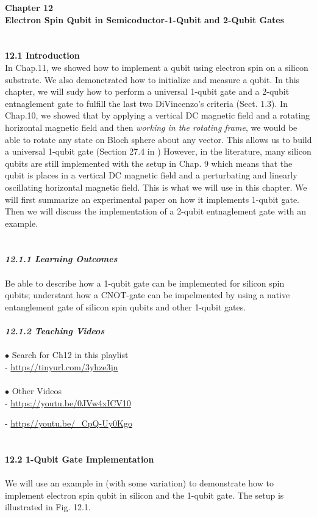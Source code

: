 \documentclass{article}
\newcommand{\bfit}[1]{\textit{\textbf{#1}}}
\begin{document}
\medskip
\noindent
\textbf{\Large Chapter 12\\
Electron Spin Qubit in Semicoductor-1-Qubit and 2-Qubit Gates}\\\\\\
\medskip
\textbf{\large 12.1 Introduction}\\
In Chap.11, we showed how to implement a qubit using electron spin on a silicon
substrate. We also demonetrated how to initialize and measure a qubit. In this chapter,
we will sudy how to perform a universal 1-qubit gate and a 2-qubit entnaglement gate to fulfill
the last two DiVincenzo's criteria (Sect. 1.3). In Chap.10, we showed
that by applying a vertical DC magnetic field and a rotating  horizontal magnetic field and
then \textit{working in the rotating frame}, we would be able to rotate any state on Bloch sphere
about any vector. This allows us to build a universal 1-qubit gate (Section 27.4 in \cite{WongHuiYong})
However, in the literature, many silicon qubits are still implemented with the setup in Chap. 9 which means
that the qubit is places in a vertical DC magnetic field and a perturbating and linearly oscillating horizontal
magnetic field. This is what we will use in this chapter. We will first summarize an experimental paper on how
it implements 1-qubit gate. Then we will discuss the implementation of a 2-qubit entnaglement gate with an example.
\\\\\\
\bfit{\large 12.1.1 Learning Outcomes}
\\\\
Be able to describe how a 1-qubit gate can be implemented for silicon spin qubits; 
understant how a CNOT-gate can be impelmented by using a native entanglement gate of
silicon spin qubits and other 1-qubit gates.
\\\\
\bfit{\large 12.1.2 Teaching Videos}\\\\
$\bullet$ Search for Ch12 in this playlist\\

- \url{https//tinyurl.com/3yhze3jn}\\\\
$\bullet$ Other Videos\\

- \url{https://youtu.be/0JVw4xICV10}

- \url{https//youtu.be/_CpQ-Uy0Kgo}
\\\\\\
\textbf{\large 12.2 1-Qubit Gate Implementation}
\\\\
We will use an example in \cite{veldhorst2014addressable} (with some variation)
to demonstrate how to implement electron spin qubit in silicon and the 1-qubit gate.
The setup is illustrated in Fig. 12.1.
\end{document}
